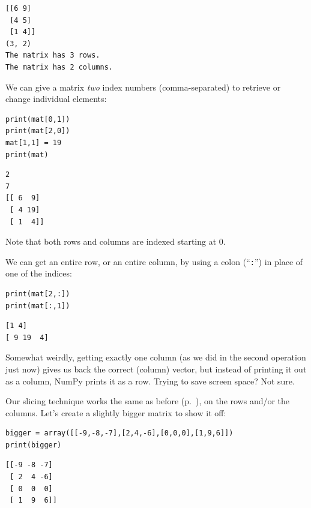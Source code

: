 \begin{Verbatim}[fontsize=\small,samepage=true,frame=leftline,framesep=5mm,framerule=1mm]
[[6 9]
 [4 5]
 [1 4]]
(3, 2)
The matrix has 3 rows.
The matrix has 2 columns.
\end{Verbatim}


We can give a matrix \textit{two} index numbers (comma-separated) to retrieve
or change individual elements:

\begin{Verbatim}[fontsize=\small,samepage=true,frame=single,framesep=3mm]
print(mat[0,1])
print(mat[2,0])
mat[1,1] = 19
print(mat)
\end{Verbatim}
\vspace{-.2in}

\begin{Verbatim}[fontsize=\small,samepage=true,frame=leftline,framesep=5mm,framerule=1mm]
2
7
[[ 6  9]
 [ 4 19]
 [ 1  4]]
\end{Verbatim}


Note that both rows and columns are indexed starting at 0.

\medskip

We can get an entire row, or an entire column, by using a colon
(``\texttt{:}'') in place of one of the indices:

\begin{Verbatim}[fontsize=\small,samepage=true,frame=single,framesep=3mm]
print(mat[2,:])
print(mat[:,1])
\end{Verbatim}
\vspace{-.2in}

\begin{Verbatim}[fontsize=\small,samepage=true,frame=leftline,framesep=5mm,framerule=1mm]
[1 4]
[ 9 19  4]
\end{Verbatim}

Somewhat weirdly, getting exactly one column (as we did in the second operation
just now) gives us back the correct (column) vector, but instead of printing it
out as a column, NumPy prints it as a row. Trying to save screen space? Not
sure.

\medskip

Our slicing technique works the same as before (p.~\pageref{slice}), on the
rows and/or the columns. Let's create a slightly bigger matrix to show it off:

\begin{Verbatim}[fontsize=\small,samepage=true,frame=single,framesep=3mm]
bigger = array([[-9,-8,-7],[2,4,-6],[0,0,0],[1,9,6]])
print(bigger)
\end{Verbatim}
\vspace{-.2in}
\begin{Verbatim}[fontsize=\small,samepage=true,frame=leftline,framesep=5mm,framerule=1mm]
[[-9 -8 -7]
 [ 2  4 -6]
 [ 0  0  0]
 [ 1  9  6]]
\end{Verbatim}

